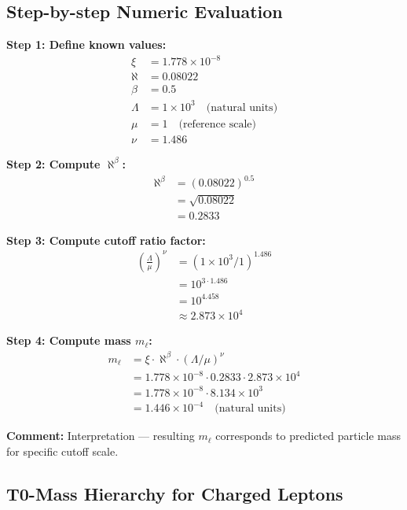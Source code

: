 \documentclass[12pt,a4paper]{article}
\newcommand{\xipar}{\xi}            %
\newcommand{\nulep}{\nu}            %
\begin{document}
\subsection{Step-by-step Numeric Evaluation}

\textbf{Step 1: Define known values:}
\begin{align}
	\xipar &= 1.778 \times 10^{-8} \\
	\aleph &= 0.08022 \\
	\beta &= 0.5 \\
	\Lambda &= 1 \times 10^{3} \quad \text{(natural units)} \\
	\mu &= 1 \quad \text{(reference scale)} \\
	\nulep &= 1.486
\end{align}

\textbf{Step 2: Compute $\aleph^\beta$:}
\begin{align}
	\aleph^{\beta} &= (0.08022)^{0.5} \\
	&= \sqrt{0.08022} \\
	&= 0.2833
\end{align}

\textbf{Step 3: Compute cutoff ratio factor:}
\begin{align}
	\left( \frac{\Lambda}{\mu} \right)^{\nulep} &= (1 \times 10^3 / 1)^{1.486} \\
	&= 10^{3 \cdot 1.486} \\
	&= 10^{4.458} \\
	&\approx 2.873 \times 10^4
\end{align}

\textbf{Step 4: Compute mass $m_\ell$:}
\begin{align}
	m_\ell &= \xipar \cdot \aleph^\beta \cdot (\Lambda/\mu)^\nulep \\
	&= 1.778 \times 10^{-8} \cdot 0.2833 \cdot 2.873 \times 10^4 \\
	&= 1.778 \times 10^{-8} \cdot 8.134 \times 10^3 \\
	&= 1.446 \times 10^{-4} \quad \text{(natural units)}
\end{align}

\textbf{Comment:} Interpretation — resulting $m_\ell$ corresponds to predicted particle mass for specific cutoff scale.

\subsection{T0-Mass Hierarchy for Charged Leptons}
\end{document}
